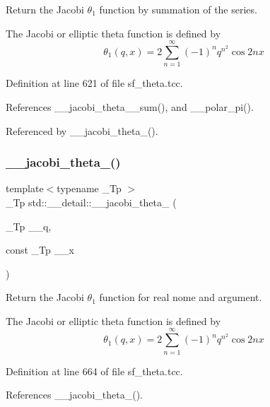 Return the Jacobi $ \theta_1 $ function by summation of the series.

The Jacobi or elliptic theta function is defined by \[ \theta_1(q,x) = 2\sum_{n=1}^{\infty}(-1)^n q^{n^2}\cos{2nx} \] 

Definition at line 621 of file sf\+\_\+theta.\+tcc.



References \+\_\+\+\_\+jacobi\+\_\+theta\+\_\+\_\+sum(), and \+\_\+\+\_\+polar\+\_\+pi().



Referenced by \+\_\+\+\_\+jacobi\+\_\+theta\+\_().

\mbox{\label{namespacestd_1_1____detail_af98af6bb3dd83f6a28c777d8fbaa5e51}} 
\subsubsection{\texorpdfstring{\+\_\+\+\_\+jacobi\+\_\+theta\+\_()}{\_\_jacobi\_theta\_1()}\hspace{0.1cm}{\footnotesize\ttfamily [2/2]}}
{\footnotesize\ttfamily template$<$typename \+\_\+\+Tp $>$ \\
\+\_\+\+Tp std\+::\+\_\+\+\_\+detail\+::\+\_\+\+\_\+jacobi\+\_\+theta\+\_ (\begin{DoxyParamCaption}\item[{\+\_\+\+Tp}]{\+\_\+\+\_\+q,  }\item[{const \+\_\+\+Tp}]{\+\_\+\+\_\+x }\end{DoxyParamCaption})}

Return the Jacobi $ \theta_1 $ function for real nome and argument.

The Jacobi or elliptic theta function is defined by \[ \theta_1(q,x) = 2\sum_{n=1}^{\infty}(-1)^n q^{n^2}\cos{2nx} \] 

Definition at line 664 of file sf\+\_\+theta.\+tcc.



References \+\_\+\+\_\+jacobi\+\_\+theta\+\_().

\mbox{\label{namespacestd_1_1____detail_adea964551a6650baebe13574d942bf50}} 
